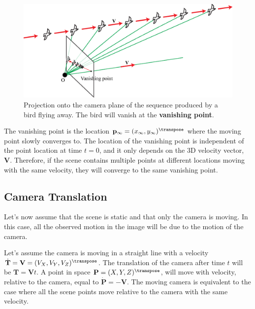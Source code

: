 \begin{figure}[h!]
    \centerline{
        \includegraphics[width=1\linewidth]{figures/optical_flow/flying_bird.eps}
    }
    \caption{Projection onto the camera plane of the sequence produced by a bird flying away. The bird will vanish at the {\bf vanishing point}.}
    \label{fig:flying_bird}
\end{figure}

The vanishing point is the location $\mathbf{p}_{\infty}=(x_{\infty}, y_{\infty})^\transpose$ where the moving point slowly converges to. The location of the vanishing point is independent of the point location at time $t=0$, and it only depends on the 3D velocity vector, $\mathbf{V}$. Therefore, if the scene contains multiple points at different locations moving with the same velocity, they will converge to the same vanishing point.

\subsection{Camera Translation}

Let's now assume that the scene is static and that only the camera is moving. In this case, all the observed motion in the image will be due to the motion of the camera.

Let's assume the camera is moving in a straight line with a velocity $\dot{\mathbf{T}} = \mathbf{V} = (V_X,V_Y,V_Z)^\transpose$. The translation of the camera after time $t$ will be $\mathbf{T} = \mathbf{V} t$. A point in space $\mathbf{P} = (X,Y,Z)^\transpose$, will move with velocity, relative to the camera, equal to $\dot{\mathbf{P}} = -\mathbf{V}$.  The moving camera is equivalent to the case where all the scene points move relative to the camera with the same velocity.

